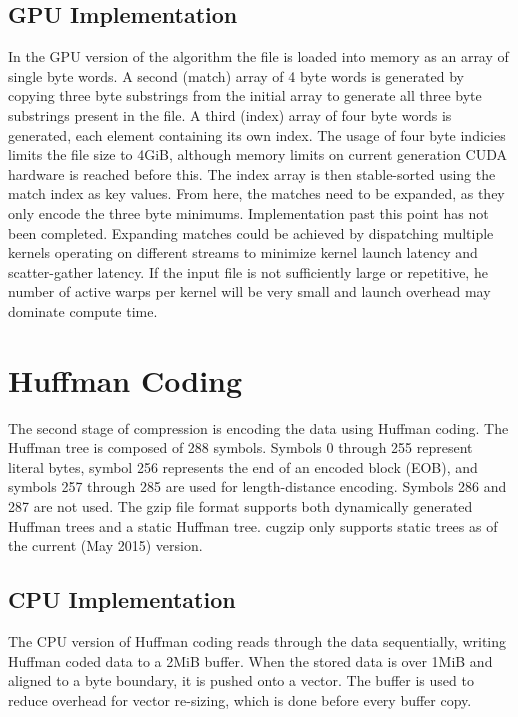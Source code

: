\documentclass[twoside]{article}
\begin{document}
\begin{multicols}{2}
\subsection{GPU Implementation}

In the GPU version of the algorithm the file is loaded into memory as an array of single byte words. A second (match) array of 4 byte words is generated by copying three byte substrings from the initial array to generate all three byte substrings present in the file. A third (index) array of four byte words is generated, each element containing its own index. The usage of four byte indicies limits the file size to 4GiB, although memory limits on current generation CUDA hardware is reached before this. The index array is then stable-sorted using the match index as key values. From here, the matches need to be expanded, as they only encode the three byte minimums. Implementation past this point has not been completed. Expanding matches could be achieved by dispatching multiple kernels operating on different streams to minimize kernel launch latency and scatter-gather latency. If the input file is not sufficiently large or repetitive, he number of active warps per kernel will be very small and launch overhead may dominate compute time.


\section{Huffman Coding}

The second stage of compression is encoding the data using Huffman coding. The Huffman tree is composed of 288 symbols. Symbols 0 through 255 represent literal bytes, symbol 256 represents the end of an encoded block (EOB), and symbols 257 through 285 are used for length-distance encoding. Symbols 286 and 287 are not used\cite{RFC1951}. The gzip file format supports both dynamically generated Huffman trees and a static Huffman tree. cugzip only supports static trees as of the current (May 2015) version.

\subsection{CPU Implementation}

The CPU version of Huffman coding reads through the data sequentially, writing Huffman coded data to a 2MiB buffer. When the stored data is over 1MiB and aligned to a byte boundary, it is pushed onto a vector. The buffer is used to reduce overhead for vector re-sizing, which is done before every buffer copy.


\end{multicols}
\end{document}
